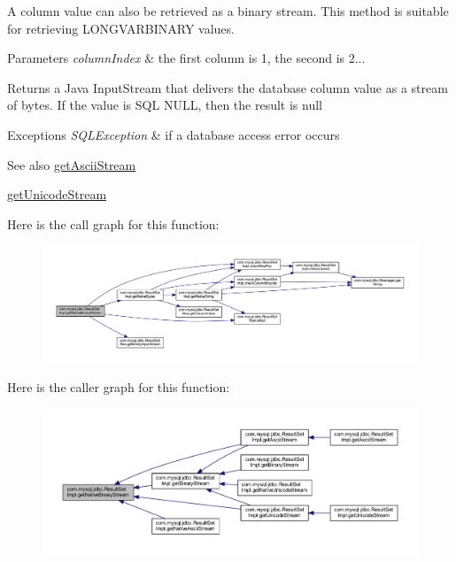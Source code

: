 A column value can also be retrieved as a binary stream. This method is suitable for retrieving L\+O\+N\+G\+V\+A\+R\+B\+I\+N\+A\+RY values.


\begin{DoxyParams}{Parameters}
{\em column\+Index} & the first column is 1, the second is 2...\\
\hline
\end{DoxyParams}
\begin{DoxyReturn}{Returns}
a Java Input\+Stream that delivers the database column value as a stream of bytes. If the value is S\+QL N\+U\+LL, then the result is null
\end{DoxyReturn}

\begin{DoxyExceptions}{Exceptions}
{\em S\+Q\+L\+Exception} & if a database access error occurs\\
\hline
\end{DoxyExceptions}
\begin{DoxySeeAlso}{See also}
\mbox{\hyperlink{classcom_1_1mysql_1_1jdbc_1_1_result_set_impl_a3121b8b483b8b8bfcdf6b1b977a60808}{get\+Ascii\+Stream}} 

\mbox{\hyperlink{classcom_1_1mysql_1_1jdbc_1_1_result_set_impl_ae1fb89a978f6a70882bb7305f8266234}{get\+Unicode\+Stream}} 
\end{DoxySeeAlso}
Here is the call graph for this function\+:
\nopagebreak
\begin{figure}[H]
\begin{center}
\leavevmode
\includegraphics[width=350pt]{classcom_1_1mysql_1_1jdbc_1_1_result_set_impl_adc7bde8fcf56a85896f2d2320ae400be_cgraph}
\end{center}
\end{figure}
Here is the caller graph for this function\+:
\nopagebreak
\begin{figure}[H]
\begin{center}
\leavevmode
\includegraphics[width=350pt]{classcom_1_1mysql_1_1jdbc_1_1_result_set_impl_adc7bde8fcf56a85896f2d2320ae400be_icgraph}
\end{center}
\end{figure}
